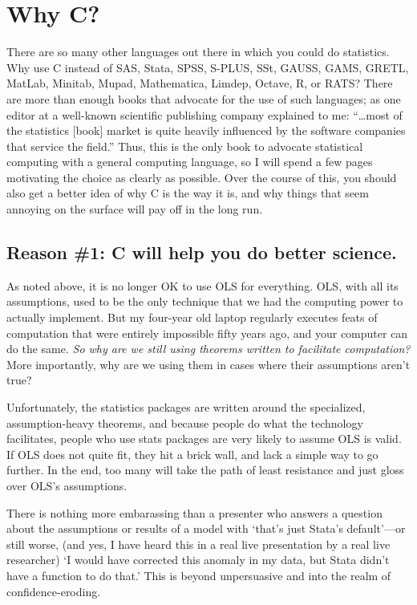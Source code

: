 \section{Why C?}

There are so many other languages out there in which you could do
statistics. Why use C instead of SAS, Stata, SPSS, S-PLUS, SSt, GAUSS, GAMS, GRETL,
MatLab, Minitab, Mupad, Mathematica, Limdep, Octave, R, or RATS? 
There are more than enough books that advocate for the use of such
languages; 
as one editor at a well-known scientific publishing company
explained to me: ``\dots most of the statistics [book] market is quite heavily
influenced by the software companies that service the
field.''  Thus, this is the only book to advocate statistical computing
with a general computing language, so I will spend a few pages
motivating the choice as clearly as possible. Over the course of this, you should
also get a better idea of why C is the way it is, and why things that
seem annoying on the surface will pay off in the long run.
\ifbook
\subsection{Reason \#1: C will help you do better science.}
As noted above, it is no longer OK to use OLS for everything.
OLS, with all its assumptions, used to be the only technique that we had the computing
power to actually implement. But my four-year old laptop regularly executes
feats of computation that were entirely impossible fifty years ago, and your
computer can do the same.  {\it So why are
we still using theorems written to facilitate computation?} More importantly, why
are we using them in cases where their assumptions aren't true?

Unfortunately, the statistics packages are written around the
specialized, assumption-heavy theorems, and because people do what the
technology facilitates, people who use stats packages are very
likely to assume OLS is valid.  If OLS does not quite fit, they hit a
brick wall, and lack a simple way to go further. In the end, too many
will take the path of least resistance and just gloss over OLS's assumptions.

There is nothing more embarassing than a presenter who answers a question
about the assumptions or results of a model with `that's just Stata's
default'---or still worse, (and yes, I have heard this in a real live
presentation by a real live researcher) `I would have corrected this
anomaly in my data, but Stata didn't have a function to do that.' This
is beyond unpersuasive and into the realm of confidence-eroding.

